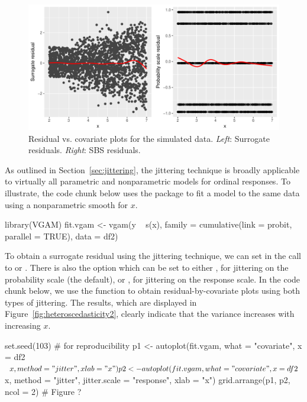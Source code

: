 \begin{figure}[!htbp]
  \centering
  \includegraphics[width=1\textwidth]{heteroscedasticity}
  \caption{Residual vs. covariate plots for the simulated data. \textit{Left}: Surrogate residuals. \textit{Right}: SBS residuals.}
  \label{fig:heteroscedasticity}
\end{figure}

As outlined in Section~\ref{sec:jittering}, the jittering technique is broadly applicable to virtually all parametric and nonparametric models for ordinal responses. To illustrate, the code chunk below uses the  package to fit a  model to the same data using a nonparametric smooth for $x$.
\begin{example}
library(VGAM)
fit.vgam <- vgam(y ~ s(x), family = cumulative(link = probit, parallel = TRUE),
                 data = df2)
\end{example}

To obtain a surrogate residual using the jittering technique, we can set  in the call to  or . There is also the option  which can be set to either , for jittering on the probability scale (the default), or , for jittering on the response scale. In the code chunk below, we use the  function to obtain residual-by-covariate plots using both types of jittering. The results, which are displayed in Figure~\ref{fig:heteroscedasticity2}, clearly indicate that the variance increases with increasing $x$.
\begin{example}
set.seed(103)  # for reproducibility
p1 <- autoplot(fit.vgam, what = "covariate", x = df2$x, method = "jitter",
               xlab = "x")
p2 <- autoplot(fit.vgam, what = "covariate", x = df2$x, method = "jitter",
               jitter.scale = "response", xlab = "x")
grid.arrange(p1, p2, ncol = 2)  # Figure ?
\end{example}

